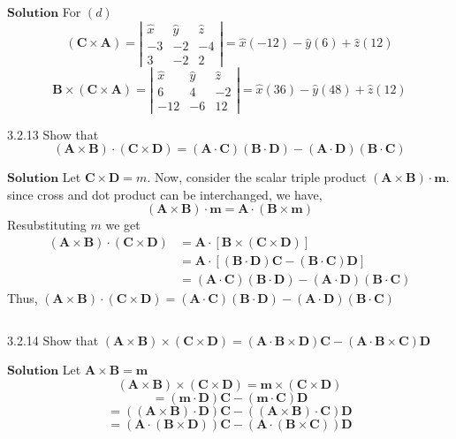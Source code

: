 \documentclass{article}
\begin{document}
\begin{flushleft}
$\boxed{\textbf{Solution}}$ For $(d)$ 
$$(\mathbf{C} \times \mathbf{A})=\left|\begin{array}{ccc}\hat{x} & \hat{y} & \hat{z} \\ -3 & -2 & -4 \\ 3 & -2 & 2\end{array}\right|=\hat{x}(-12)-\hat{y}(6)+\hat{z}(12)$$
$$\mathbf{B} \times(\mathbf{C} \times \mathbf{A})=\left|\begin{array}{ccc}\hat{x} & \hat{y} & \hat{z} \\ 6 & 4 & -2 \\ -12 & -6 & 12\end{array}\right|=\hat{x}(36)-\hat{y}(48)+\hat{z}(12)$$

\newpage


\begin{mybox}{3.2.13}
Show that
$$
(\mathbf{A} \times \mathbf{B}) \cdot(\mathbf{C} \times \mathbf{D})=(\mathbf{A} \cdot \mathbf{C})(\mathbf{B} \cdot \mathbf{D})-(\mathbf{A} \cdot \mathbf{D})(\mathbf{B} \cdot \mathbf{C})
$$
\end{mybox}

$\boxed{\textbf{Solution}}$ Let $\mathbf{C} \times \mathbf{D}=m$.
Now, consider the scalar triple product $(\mathbf{A} \times \mathbf{B}) \cdot \mathbf{m}$.
since cross and dot product can be interchanged, we have,
$$
(\mathbf{A} \times \mathbf{B}) \cdot \mathbf{m}=\mathbf{A} \cdot(\mathbf{B} \times \mathbf{m})
$$
Resubstituting $m$ we get
$$\begin{aligned}(\mathbf{A} \times \mathbf{B}) \cdot(\mathbf{C} \times \mathbf{D}) &=\mathbf{A} \cdot[\mathbf{B} \times(\mathbf{C} \times \mathbf{D})] \\ &=\mathbf{A} \cdot[(\mathbf{B} \cdot \mathbf{D}) \mathbf{C}-(\mathbf{B} \cdot \mathbf{C})\mathbf{D}] \\ &=(\mathbf{A} \cdot \mathbf{C})(\mathbf{B} \cdot \mathbf{D})-(\mathbf{A} \cdot \mathbf{D})(\mathbf{B} \cdot \mathbf{C}) \end{aligned}$$
Thus, $(\mathbf{A} \times \mathbf{B}) \cdot(\mathbf{C} \times \mathbf{D})=(\mathbf{A} \cdot \mathbf{C})(\mathbf{B} \cdot \mathbf{D})-(\mathbf{A} \cdot \mathbf{D})(\mathbf{B} \cdot \mathbf{C})$

$$$$

\begin{mybox}{3.2.14}
Show that
$(\mathbf{A} \times \mathbf{B}) \times(\mathbf{C} \times \mathbf{D})=(\mathbf{A} \cdot \mathbf{B} \times \mathbf{D}) \mathbf{C}-(\mathbf{A} \cdot \mathbf{B} \times \mathbf{C}) \mathbf{D}$
\end{mybox}
$\boxed{\textbf{Solution}}$ Let $\mathbf{A} \times \mathbf{B}=\mathbf{m}$
$$(\mathbf{A} \times \mathbf{B}) \times(\mathbf{C} \times \mathbf{D})=\mathbf{m} \times(\mathbf{C} \times \mathbf{D})$$
$$=(\mathbf{m} \cdot \mathbf{D}) \mathbf{C}-(\mathbf{m} \cdot \mathbf{C})\mathbf{D}$$
$$=((\mathbf{A} \times \mathbf{B}) \cdot \mathbf{D}) \mathbf{C}-((\mathbf{A} \times \mathbf{B}) \cdot \mathbf{C})\mathbf{D}$$
$$=(\mathbf{A} \cdot(\mathbf{B} \times \mathbf{D})) \mathbf{C}-(\mathbf{A} \cdot(\mathbf{B} \times \mathbf{C}))\mathbf{D}$$



\end{flushleft}
\end{document}
